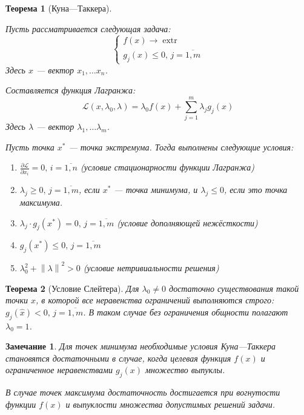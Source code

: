\documentclass{article}
\renewcommand{\leq}{\leqslant}
\renewcommand{\geq}{\geqslant}
\providecommand{\La}{\mathcal{L}}
\providecommand{\pardiff}[2]{\frac{\partial{#1}}{\partial{#2}}}
\providecommand{\norm}[1]{\left \lVert{#1}\right \rVert}
\DeclareMathOperator{\extr}{extr}
\newtheorem{thm}{Теорема}
\newtheorem{rem}{Замечание}
\numberwithin{equation}{section}
\begin{document}
\begin{thm}[Куна—Таккера]
  \label{th:kuhn-tucker}

  Пусть рассматривается следующая задача:
  \begin{equation*}
    \begin{cases}
      f(x) \to \extr \\
      g_j(x) \leq 0,\, j=\overline{1,m}
    \end{cases}
  \end{equation*}
  Здесь $x$ — вектор $x_1, \dotsc x_n$.

  Составляется \emph{функция Лагранжа}:
  \begin{equation*}
    \La(x, \lambda_0, \lambda) = \lambda_0 f(x) + \sum_{j=1}^m {\lambda_j g_j(x)}
  \end{equation*}
  Здесь $\lambda$ — вектор $\lambda_1, \dotsc \lambda_m$.
    
  Пусть точка $x^*$ — точка экстремума. Тогда выполнены следующие условия:
  \begin{enumerate}
    \renewcommand{\labelenumi}{\emph{\asbuk{enumi})}}
  \item $\pardiff{\La}{x_i}=0,\, i=\overline{1,n}$ (условие
    стационарности функции Лагранжа)
  \item $\lambda_j \geq 0,\, j=\overline{1,m}$, если $x^*$ — точка
    минимума, и $\lambda_j \leq 0$, если это точка максимума.
  \item $\lambda_j \cdot g_j(x^*) = 0,\, j=\overline{1,m}$ (условие
    дополняющей нежёсткости)
  \item $g_j(x^*) \leq 0,\, j=\overline{1,m}$
  \item $\lambda_0^2 + \norm{\lambda}^2 > 0$ (условие нетривиальности решения)
  \end{enumerate}
\end{thm}

\begin{thm}[Условие Слейтера]
  Для $\lambda_0 \neq 0$ достаточно существования такой точки
  $\hat{x}$, в которой все неравенства ограничений выполняются строго:
  $g_j(\hat{x})<0,\, j=\overline{1,m}$. В таком случае без ограничения
  общности полагают $\lambda_0=1$.
\end{thm}

\begin{rem}
  Для точек минимума необходимые условия Куна—Таккера становятся
  достаточными в случае, когда целевая функция $f(x)$ и ограниченное
  неравенствами $g_j(x)$ множество \emph{выпуклы}.

  В случае точек максимума достаточность достигается при
  \emph{вогнутости} функции $f(x)$ и \emph{выпуклости} множества
  допустимых решений задачи.
\end{rem}
\end{document}

